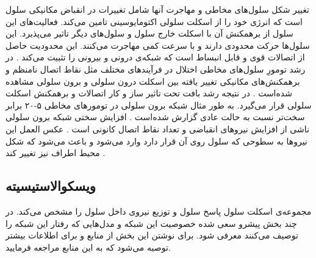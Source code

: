 تغییر شکل سلول‌های مخاطی و مهاجرت آنها شامل تغییرات در انقباض مکانیکی سلول است که انرژی خود را از اسکلت سلولی اکتومایوسینی تامین می‌کند. فعالیت‌های این سلول از برهمکنش‌ آن با اسکلت خارج سلول و  سلول‌های دیگر تاثیر می‌پذیرد. این سلول‌ها حرکت محدودی دارند و با سرعت کمی مهاجرت می‌کنند. این محدودیت حاصل از اتصالات قوی و قابل انبساط است که شبکه‌ی درونی و بیرونی را تثبیت می‌کند \cite{LANGE20132418}. در رشد تومورِ سلول‌های مخاطی اختلال در فرآیندهای مختلف مثل نقاط اتصال نامنظم و برهمکنش‌های مکانیکی تغییر یافته بین اسکلت درون سلولی و برون سلولی مشاهده شده‌است \cite{LANGE20132418}. در نتیجه رشد بافت تحت تاثیر ساز و کار اتصالات و برهمکنش اسکلت سلولی قرار می‌گیرد. به طور مثال شبکه برون سلولی در تومورهای مخاطی ۵-۲۰ برابر سخت‌تر نسبت به حالت عادی گزارش شده‌است \cite{Paszek:2005qq}. افزایش سختی شبکه برون سلولی ناشی از افزایش نیروهای انقباضی و تعداد نقاط اتصال کانونی است \cite{LANGE20132418}. عکس العمل این نیرو‌ها به سطوحی که سلول روی آن قرار دارد وارد می‌شود و باعث می‌شود که شکل محیط اطراف نیز تغییر کند \cite{PhysRevB.14.3438}.



\subsection{ویسکوالاستیسیته}
مجموعه‌ی اسکلت سلول پاسخ سلول و توزیع نیروی داخل سلول را مشخص می‌کند. در چند بخش  پیشرو سعی شده خصوصیت این شبکه و مدل‌هایی که رفتار این شبکه ‌را توصیف می‌کنند معرفی شود. برای نوشتن این بخش از منابع \cite{doi, Viscoelasticity, visco} و برای اطلاعات بیشتر توصیه می‌شود که به این منابع مراجعه فرمایید.
